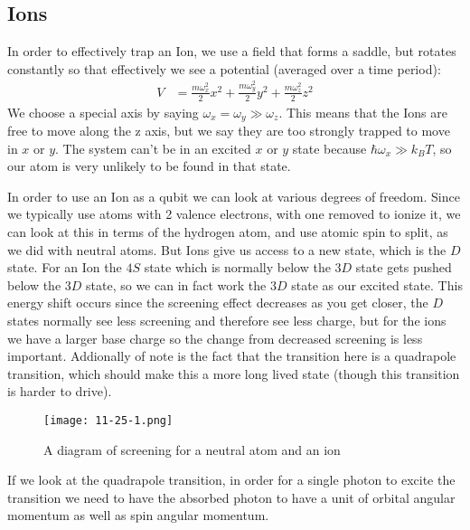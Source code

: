 \subsection{Ions}
In order to effectively trap an Ion, we use a field that forms a saddle, but rotates constantly so that effectively we see a potential (averaged over a time period):
\begin{align*}
	V &= \frac{m\omega_x^2}{2} x^2 + \frac{m\omega_y^2}{2}y^2 + \frac{m\omega_z^2}{2}z^2
\end{align*}
We choose a special axis by saying $\omega_x = \omega_y \gg \omega_z$. This means that the Ions are free to move along the z axis, but we say they are too strongly trapped to move in $x$ or $y$.
The system can't be in an excited $x$ or $y$ state because $\hbar\omega_x \gg k_B T$, so our atom is very unlikely to be found in that state.

In order to use an Ion as a qubit we can look at various degrees of freedom. Since we typically use atoms with 2 valence electrons, with one removed to ionize it, we can look at this in terms of the hydrogen atom, and use atomic spin to split, as we did with neutral atoms.
But Ions give us access to a new state, which is the $D$ state. For an Ion the $4S$ state which is normally below the $3D$ state gets pushed below the $3D$ state, so we can in fact work the $3D$ state as our excited state.
This energy shift occurs since the screening effect decreases as you get closer, the $D$ states normally see less screening and therefore see less charge, but for the ions we have a larger base charge so the change from decreased screening is less important.
Addionally of note is the fact that the transition here is a quadrapole transition, which should make this a more long lived state (though this transition is harder to drive). \\
\begin{figure*}[h]
	\centering
	\texttt{[image: 11-25-1.png]}
	\caption*{A diagram of screening for a neutral atom and an ion}
\end{figure*}
If we look at the quadrapole transition, in order for a single photon to excite the transition we need to have the absorbed photon to have a unit of orbital angular momentum as well as spin angular momentum.


